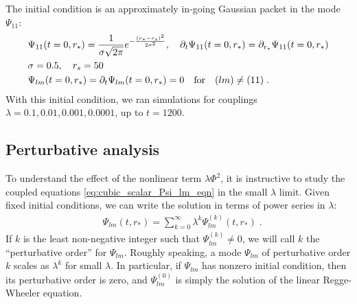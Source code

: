 \documentclass[reprint,aps,physrev,superscriptaddress,10pt,notitlepage,prd,nofootinbib,onecolumn]{revtex4-2}
\begin{document}
The initial condition is an approximately in-going Gaussian packet in the mode $\Psi_{11}$:
\begin{align}
  \label{eq:cubic_scalar_Psi_IC}
  &\Psi_{11}(t=0,r_*) = \frac{1}{\sigma \sqrt{2\pi}} e^{-\frac{(r_*-r_s)^2}{2 \sigma^2 }},\quad
                       \partial_t\Psi_{11}(t=0,r_*) = \partial_{r_*} \Psi_{11}(t=0,r_*) \nonumber \\
  &  \sigma = 0.5,\quad r_s = 50 \nonumber \\
  & \Psi_{lm}(t=0,r_*) = \partial_t \Psi_{lm}(t=0,r_*) = 0 \qq{for} (lm) \neq (11) \;.
\end{align}
With this initial condition, we ran simulations for couplings $\lambda = 0.1, 0.01, 0.001, 0.0001$, up to $t=1200$.



\subsection{Perturbative analysis}
\label{sec:coupled_simulation_analytical}
To understand the effect of the nonlinear term $\lambda \Phi^2$, it is instructive to study the coupled equations \eqref{eq:cubic_scalar_Psi_lm_eqn} in the small $\lambda$ limit.
Given fixed initial conditions, we can write the solution in terms of power series in $\lambda$:
\begin{align}
  & \Psi_{lm}(t, r_*) = \sum_{k=0}^\infty \lambda^k \Psi_{lm}^{(k)}(t, r_*) \;.
\end{align}
If $k$ is the least non-negative integer such that $\Psi_{lm}^{(k)} \neq 0$, we will call $k$ the ``perturbative order'' for $\Psi_{lm}$.
Roughly speaking, a mode $\Psi_{lm}$ of perturbative order $k$ scales as $\lambda^k$ for small $\lambda$.
In particular, if $\Psi_{lm}$ has nonzero initial condition, then its perturbative order is zero, and $\Psi_{lm}^{(0)}$ is simply the solution of the linear Regge-Wheeler equation.
\end{document}
